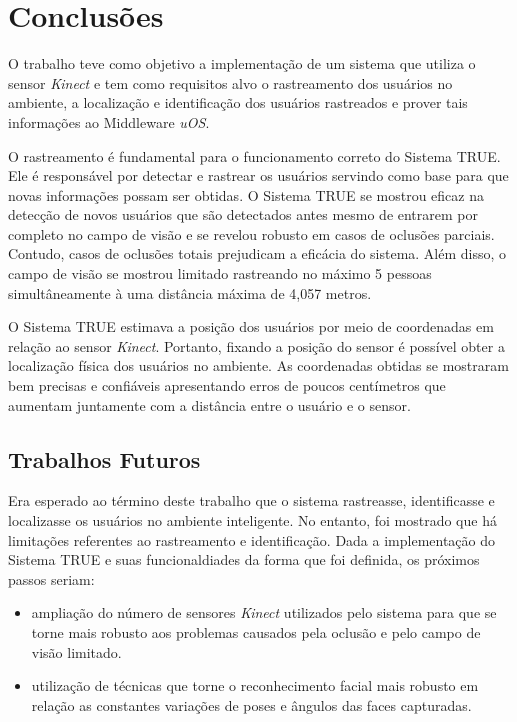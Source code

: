 \chapter{Conclusões}
\label{cap:conclusao}

O trabalho teve como objetivo a implementação de um sistema que utiliza o sensor \textit{Kinect} e tem como requisitos alvo o rastreamento dos usuários no ambiente, a localização e identificação dos usuários rastreados e prover tais informações ao Middleware \textit{uOS}.

O rastreamento é fundamental para o funcionamento correto do Sistema TRUE. Ele é responsável por detectar e rastrear os usuários servindo como base para que novas informações possam ser obtidas. O Sistema TRUE se mostrou eficaz na detecção de novos usuários que são detectados antes mesmo de entrarem por completo no campo de visão e se revelou robusto em casos de oclusões parciais. Contudo, casos de oclusões totais prejudicam a eficácia do sistema. Além disso, o campo de visão se mostrou limitado rastreando no máximo 5 pessoas simultâneamente à uma distância máxima de 4,057 metros.

O Sistema TRUE estimava a posição dos usuários por meio de coordenadas em relação ao sensor \textit{Kinect}. Portanto, fixando a posição do sensor é possível obter a localização física dos usuários no ambiente. As coordenadas obtidas se mostraram bem precisas e confiáveis apresentando erros de poucos centímetros que aumentam juntamente com a distância entre o usuário e o sensor. 


\section{Trabalhos Futuros}

Era esperado ao término deste trabalho que o sistema rastreasse, identificasse e localizasse os usuários no ambiente inteligente. No entanto, foi mostrado que há limitações referentes ao rastreamento e identificação. Dada a implementação do Sistema TRUE e suas funcionaldiades da forma que foi definida, os próximos passos seriam:

\begin{itemize}
	\item ampliação do número de sensores \textit{Kinect} utilizados pelo sistema para que se torne mais robusto aos problemas causados pela oclusão e pelo campo de visão limitado.
	\item utilização de técnicas que torne o reconhecimento facial mais robusto em relação as constantes variações de poses e ângulos das faces capturadas.
\end{itemize}




